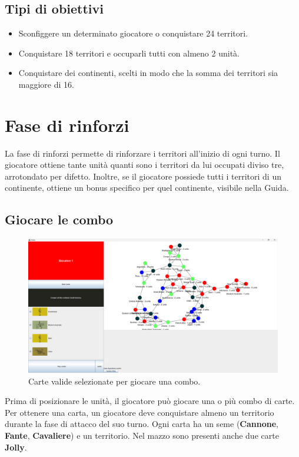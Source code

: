 \documentclass[a4paper,12pt]{report}
\begin{document}
\subsection{Tipi di obiettivi}
\begin{itemize}
	\item Sconfiggere un determinato giocatore o conquistare 24 territori.
	\item Conquistare 18 territori e occuparli tutti con almeno 2 unità.
	\item Conquistare dei continenti, scelti in modo che la somma dei territori sia maggiore di 16.
\end{itemize}

\section{Fase di rinforzi}
La fase di rinforzi permette di rinforzare i territori all'inizio di ogni turno.
Il giocatore ottiene tante unità quanti sono i territori da lui occupati diviso tre, arrotondato per difetto.
Inoltre, se il giocatore possiede tutti i territori di un continente, ottiene un bonus specifico per quel continente, visibile nella Guida.
\subsection{Giocare le combo}
\begin{figure}[H]
	\centering
	\includegraphics[width=1\textwidth]{user_guide/7_playing_combo.png}
	\caption{Carte valide selezionate per giocare una combo.}
\end{figure}

Prima di posizionare le unità, il giocatore può giocare una o più combo di carte. Per ottenere una carta, un giocatore deve conquistare almeno un territorio durante la fase di attacco del suo turno.
Ogni carta ha un seme (\textbf{Cannone}, \textbf{Fante}, \textbf{Cavaliere}) e un territorio.
Nel mazzo sono presenti anche due carte \textbf{Jolly}.
\end{document}
